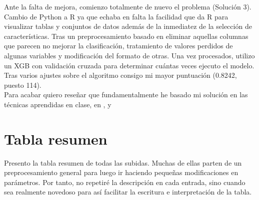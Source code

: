 Ante la falta de mejora, comienzo totalmente de nuevo el problema (Solución 3). Cambio de Python a R ya que echaba en falta la facilidad que da R para visualizar tablas y conjuntos de datos además de la inmediatez de la selección de características. Tras un preprocesamiento basado en eliminar aquellas columnas que parecen no mejorar la clasificación, tratamiento de valores perdidos de algunas variables y modificación del formato de otras. Una vez procesados, utilizo un XGB con validación cruzada para determinar cuántas veces ejecuto el modelo. Tras varios ajustes sobre el algoritmo consigo mi mayor puntuación (0.8242, puesto 114). \\

Para acabar quiero reseñar que fundamentalmente he basado mi solución en las técnicas aprendidas en clase, en \cite{data_mining_book}, \cite{sklearn} y \cite{foro}


\section{Tabla resumen}

Presento la tabla resumen de todas las subidas. Muchas de ellas parten de un preprocesamiento general para luego ir haciendo pequeñas modificaciones en parámetros. Por tanto, no repetiré la descripción en cada entrada, sino cuando sea realmente novedoso para así facilitar la escritura e interpretación de la tabla. 



